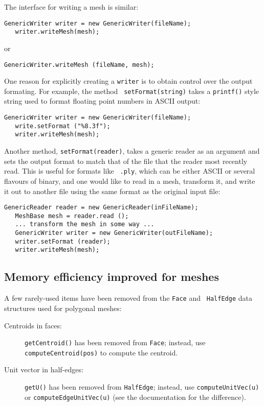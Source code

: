\documentclass{article}
\begin{document}
The interface for writing a mesh is similar:
\begin{lstlisting}[]
   GenericWriter writer = new GenericWriter(fileName);
   writer.writeMesh(mesh);
\end{lstlisting}
or 
\begin{lstlisting}[]
   GenericWriter.writeMesh (fileName, mesh);
\end{lstlisting}

One reason for explicitly creating a {\tt writer} is to obtain
control over the output formating. For example, the method {\tt
setFormat(string)} takes a {\tt printf()} style string used
to format floating point numbers in ASCII output:
\begin{lstlisting}[]
   GenericWriter writer = new GenericWriter(fileName);
   write.setFormat ("%8.3f");
   writer.writeMesh(mesh);
\end{lstlisting}
Another method, {\tt setFormat(reader)}, takes a generic reader as an
argument and sets the output format to match that of the file that the
reader most recently read. This is useful for formats like {\tt
.ply}, which can be either ASCII or several flavours of binary,
and one would like to read in a mesh, transform it, and write
it out to another file using the same format as the original input file:
\begin{lstlisting}[]
   GenericReader reader = new GenericReader(inFileName);
   MeshBase mesh = reader.read ();
   ... transform the mesh in some way ...
   GenericWriter writer = new GenericWriter(outFileName);
   writer.setFormat (reader);
   writer.writeMesh(mesh);
\end{lstlisting}

\subsection*{Memory efficiency improved for meshes}

A few rarely-used items have been removed from the {\tt Face} and {\tt
HalfEdge} data structures used for polygonal meshes:

\begin{description}

\item [Centroids in faces:] {\tt getCentroid()} has been removed
from {\tt Face}; instead, use {\tt computeCentroid(pos)} to compute
the centroid.

\item [Unit vector in half-edges:] {\tt getU()} has
been removed from {\tt HalfEdge}; instead, use {\tt computeUnitVec(u)}
or {\tt computeEdgeUnitVec(u)} (see the documentation for the
difference).

\end{description}
\end{document}
